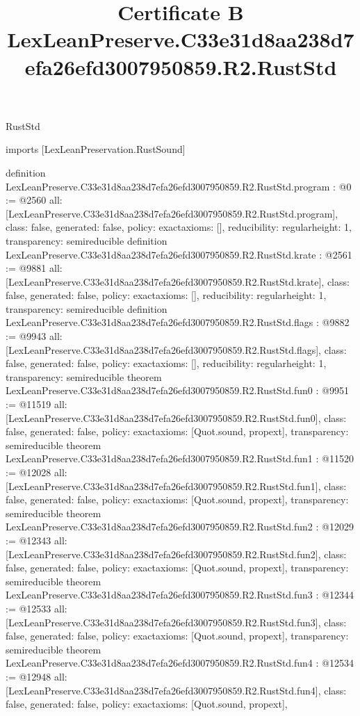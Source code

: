 \begin{lexlean}{RustStd}
\title{Certificate B LexLeanPreserve.C33e31d8aa238d7efa26efd3007950859.R2.RustStd}
\begin{coremodule}
imports [LexLeanPreservation.RustSound]

definition LexLeanPreserve.C33e31d8aa238d7efa26efd3007950859.R2.RustStd.program : @0 := @2560 {
  all: [LexLeanPreserve.C33e31d8aa238d7efa26efd3007950859.R2.RustStd.program],
  class: false,
  generated: false,
  policy: exact{axioms: []},
  reducibility: regular{height: 1},
  transparency: semireducible
}
definition LexLeanPreserve.C33e31d8aa238d7efa26efd3007950859.R2.RustStd.krate : @2561 := @9881 {
  all: [LexLeanPreserve.C33e31d8aa238d7efa26efd3007950859.R2.RustStd.krate],
  class: false,
  generated: false,
  policy: exact{axioms: []},
  reducibility: regular{height: 1},
  transparency: semireducible
}
definition LexLeanPreserve.C33e31d8aa238d7efa26efd3007950859.R2.RustStd.flags : @9882 := @9943 {
  all: [LexLeanPreserve.C33e31d8aa238d7efa26efd3007950859.R2.RustStd.flags],
  class: false,
  generated: false,
  policy: exact{axioms: []},
  reducibility: regular{height: 1},
  transparency: semireducible
}
theorem LexLeanPreserve.C33e31d8aa238d7efa26efd3007950859.R2.RustStd.fun0 : @9951 := @11519 {
  all: [LexLeanPreserve.C33e31d8aa238d7efa26efd3007950859.R2.RustStd.fun0],
  class: false,
  generated: false,
  policy: exact{axioms: [Quot.sound, propext]},
  transparency: semireducible
}
theorem LexLeanPreserve.C33e31d8aa238d7efa26efd3007950859.R2.RustStd.fun1 : @11520 := @12028 {
  all: [LexLeanPreserve.C33e31d8aa238d7efa26efd3007950859.R2.RustStd.fun1],
  class: false,
  generated: false,
  policy: exact{axioms: [Quot.sound, propext]},
  transparency: semireducible
}
theorem LexLeanPreserve.C33e31d8aa238d7efa26efd3007950859.R2.RustStd.fun2 : @12029 := @12343 {
  all: [LexLeanPreserve.C33e31d8aa238d7efa26efd3007950859.R2.RustStd.fun2],
  class: false,
  generated: false,
  policy: exact{axioms: [Quot.sound, propext]},
  transparency: semireducible
}
theorem LexLeanPreserve.C33e31d8aa238d7efa26efd3007950859.R2.RustStd.fun3 : @12344 := @12533 {
  all: [LexLeanPreserve.C33e31d8aa238d7efa26efd3007950859.R2.RustStd.fun3],
  class: false,
  generated: false,
  policy: exact{axioms: [Quot.sound, propext]},
  transparency: semireducible
}
theorem LexLeanPreserve.C33e31d8aa238d7efa26efd3007950859.R2.RustStd.fun4 : @12534 := @12948 {
  all: [LexLeanPreserve.C33e31d8aa238d7efa26efd3007950859.R2.RustStd.fun4],
  class: false,
  generated: false,
  policy: exact{axioms: [Quot.sound, propext]},
}
\end{coremodule}
\end{lexlean}

